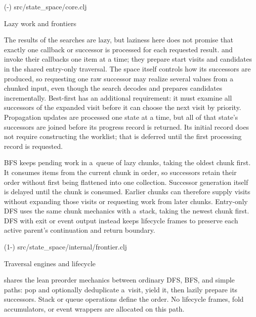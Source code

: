 {\begingroup
\typosize[8/9]
\verbinput {} (\the\sourcefirstline-\the\sourcelastline) src/state_space/core.clj
\endgroup

\secc Lazy work and frontiers

The results of the searches are lazy, but laziness here does not promise that
exactly one callback or successor is processed for each requested result.
 and  invoke their callbacks one item at a
time; they prepare start visits and candidates in the shared entry-only
traversal. The space itself controls how its successors are produced, so
requesting one raw successor may realize several values from a chunked input,
even though the search decodes and prepares candidates incrementally.
Best-first has an additional requirement: it
must examine all successors of the expanded visit before it can choose the
next visit by priority.
Propagation updates are processed one state at a time, but all of that
state's successors are joined before its progress record is returned.
Its initial record does not require constructing the worklist; that is
deferred until the first processing record is requested.

BFS keeps pending work in a~queue of lazy chunks, taking the oldest chunk
first. It consumes items from the current chunk in order, so successors
retain their order without first being flattened into one collection.
Successor generation itself is delayed until the chunk is consumed.
Earlier chunks can therefore supply visits without expanding those visits
or requesting work from later chunks. Entry-only DFS uses the same chunk
mechanics with a~stack, taking the newest chunk first. DFS with exit or event
output instead keeps lifecycle frames to preserve each active parent's
continuation and return boundary.

\begingroup
\typosize[8/9]
\verbinput {} (1-) src/state_space/internal/frontier.clj
\endgroup

\secc Traversal engines and lifecycle

 shares the lean preorder mechanics between ordinary DFS,
BFS, and simple paths: pop and optionally deduplicate a~visit, yield it,
then lazily prepare its successors. Stack or queue operations define the
order. No lifecycle frames, fold accumulators, or event wrappers are
allocated on this path.

}
